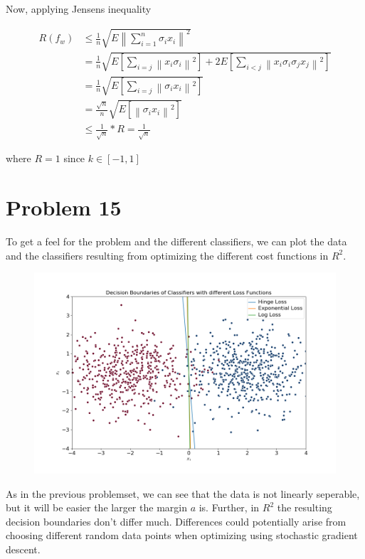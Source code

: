 \documentclass[a4paper, 11pt]{article} %
\begin{document}
Now, applying Jensens inequality 

\begin{align*}
R(f_w) & \leq \frac{1}{n} \sqrt{ E \left\|\sum_{i=1}^{n} \sigma_{i} x_{i}\right\|^2 } \\
&= \frac{1}{n} \sqrt{ E \left[ \sum_{i=j} \left\| x_i \sigma_i \right\|^2 \right] + 2 E \left[ \sum_{i<j} \left\| x_i \sigma_i \sigma_j x_j \right\|^2 \right]} \\
&= \frac{1}{n} \sqrt{E \left[ \sum_{i=j} \left\| \sigma_i x_i \right\|^2 \right]} \\
& = \frac{\sqrt{n}}{n} \sqrt{E \left[\left\| \sigma_i x_i \right\|^2 \right]} \\
& \leq \frac{1}{\sqrt{n}} * R = \frac{1}{\sqrt{n}}
\end{align*}

where $R=1$ since $k \in [-1,1]$

\section*{Problem 15}
To get a feel for the problem and the different classifiers, we can plot the data and the classifiers resulting from optimizing the different cost functions in $R^2$.

\begin{figure}[H] 
\centering
\includegraphics[scale=0.4]{Decisions_Boundaries}
\end{figure}

As in the previous problemset, we can see that the data is not linearly seperable, but it will be easier the larger the margin $a$ is. Further, in $R^2$ the resulting decision boundaries don't differ much. Differences could potentially arise from choosing different random data points when optimizing using stochastic gradient descent. 
\end{document}
